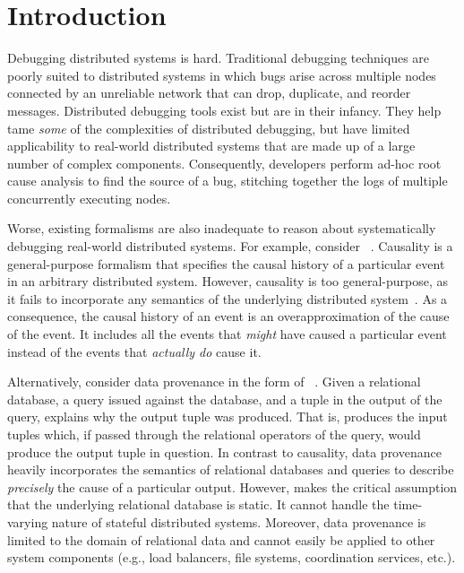 \section{Introduction}
Debugging distributed systems is hard. Traditional debugging techniques are
poorly suited to distributed systems in which bugs arise across multiple nodes
connected by an unreliable network that can drop, duplicate, and reorder
messages. Distributed debugging tools exist but are in their infancy. They help
tame \emph{some} of the complexities of distributed debugging, but have limited
applicability to real-world distributed systems that are made up of a large
number of complex components. Consequently, developers perform ad-hoc root
cause analysis to find the source of a bug, stitching together the logs of
multiple concurrently executing nodes.

Worse, existing formalisms are also inadequate to reason about systematically
debugging real-world distributed systems. For example, consider
~\cite{lamport1978time}. Causality is a general-purpose
formalism that specifies the causal history of a particular event in an
arbitrary distributed system. However, causality is too general-purpose, as it
fails to incorporate any semantics of the underlying distributed
system~\cite{bailis2012potential}. As a consequence, the causal history of an
event is an overapproximation of the cause of the event. It includes all the
events that \emph{might} have caused a particular event instead of the events
that \emph{actually do} cause it.

Alternatively, consider data provenance in the form of
~\cite{cheney2009provenance, buneman2001and}. Given a
relational database, a query issued against the database, and a tuple in the
output of the query, \whyprovenance{} explains why the output tuple was
produced. That is, \whyprovenance{} produces the input tuples which, if passed
through the relational operators of the query, would produce the output tuple
in question. In contrast to causality, data provenance heavily incorporates the
semantics of relational databases and queries to describe \emph{precisely} the
cause of a particular output. However, \whyprovenance{} makes the critical
assumption that the underlying relational database is static. It cannot handle
the time-varying nature of stateful distributed systems. Moreover, data
provenance is limited to the domain of relational data and cannot easily be
applied to other system components (e.g., load balancers, file systems,
coordination services, etc.).

